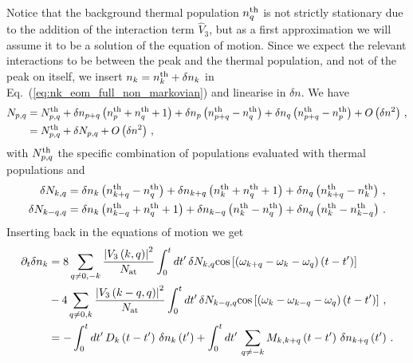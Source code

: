 \documentclass[aps,prd,notitlepage,amsfonts,amssymb,amsmath,nofootinbib,superscriptaddress,longbibliography]{revtex4-2}
\begin{document}
\begin{appendices}
Notice that the background thermal population $n^{\rm th}_q$ is not strictly stationary due to the addition of the interaction term $\hat{V}_3$, but as a first approximation we will assume it to be a solution of the equation of motion. Since we expect the relevant interactions to be between the peak and the thermal population, and not of the peak on itself, we insert $n_{k} = n^{\rm th}_{k} + \delta n_{k}$ in Eq.~(\ref{eq:nk_eom_full_non_markovian}) and linearise in $\delta n$. We have 
\begin{align}
\begin{split}
    N_{p,q} & = N_{p,q}^{\rm th} +\delta n_{p+q} \left(n^{\rm th}_{p}+n^{\rm th}_{q}+1\right) + \delta n_{p} \left(n_{p+q}^{\rm th}- n_{q}^{\rm th} \right) + \delta n_{q} \left(n_{p+q}^{\rm th}- n_{p}^{\rm th} \right) + O \left( \delta n^2 \right) \, , \\
    & = N_{p,q}^{\rm th} + \delta  N_{p,q} + O \left( \delta n^2 \right) \, , \\
\end{split}
\end{align}
with $N_{p,q}^{\rm th}$ the specific combination of populations evaluated with thermal populations and  
\begin{align}
    \delta N_{k,q} & = \delta n_{k} \left(n_{k+q}^{\rm th}- n_{q}^{\rm th} \right) + \delta n_{k+q} \left(n^{\rm th}_{k}+n^{\rm th}_{q}+1\right) +  \delta n_{q} \left(n_{k+q}^{\rm th}- n_{k}^{\rm th} \right) \, , \\
    \delta N_{k-q,q} & = \delta n_{k} \left(n^{\rm th}_{k-q}+n^{\rm th}_{q}+1\right) + \delta n_{k-q} \left(n_{k}^{\rm th}- n_{q}^{\rm th} \right) + \delta n_{q} \left(n_{k}^{\rm th}- n_{k-q}^{\rm th} \right) \, .
\end{align}
Inserting back in the equations of motion we get
\begin{align}
\begin{split}
\partial_{t} \delta n_{k} & = 8 \sum_{q \neq 0 , - k} \frac{\left|V_{3}\left(k,q\right)\right|^{2} }{N_{\rm at}} \int_{0}^{t} dt^{\prime} \,  \delta  N_{k,q} {\rm cos}\left[\left(\omega_{k+q}-\omega_{k}-\omega_{q}\right)\left(t-t^{\prime}\right)\right] \\
    & - 4 \sum_{ q \neq 0 , k }  \frac{\left|V_{3}\left(k-q,q\right)\right|^{2} }{N_{\rm at}} \int_{0}^{t} dt^{\prime} \, \delta  N_{k-q,q} {\rm cos}\left[\left(\omega_{k}-\omega_{k-q}-\omega_{q}\right)\left(t-t^{\prime}\right)\right] \, , \\
    & = - \int_{0}^{t} dt^{\prime} \, D_{k}\left(t-t^{\prime}\right) \, \delta n_{k}\left(t^{\prime}\right) + \int_{0}^{t} dt^{\prime} \, \sum_{q \neq - k } M_{k,k+q}\left(t-t^{\prime}\right) \, \delta n_{k+q}\left(t^{\prime}\right) \,.

\end{split}
\end{align}
\end{appendices}
\end{document}

